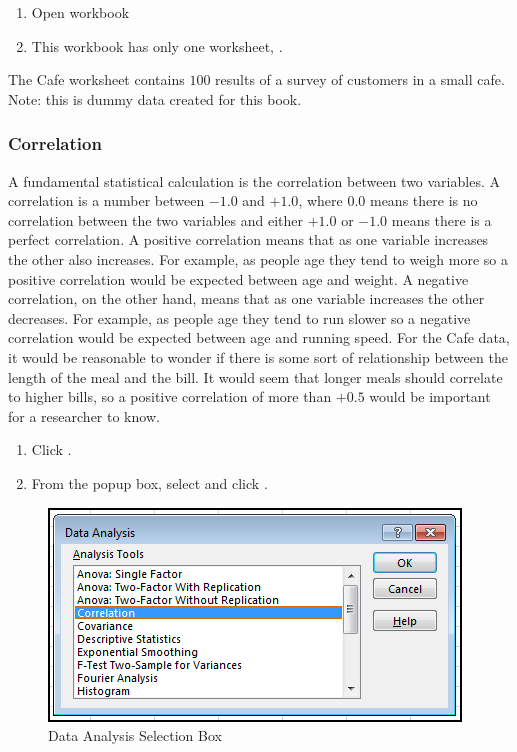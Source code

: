 \begin{enumerate}[resume]	
	\item Open workbook 
	\item This workbook has only one worksheet, .
\end{enumerate}

The Cafe worksheet contains $ 100 $ results of a survey of customers in a small cafe. Note: this is dummy data created for this book.

\subsubsection{Correlation}

A fundamental statistical calculation is the correlation between two variables. A correlation is a number between $ -1.0 $ and $ +1.0 $, where $ 0.0 $ means there is no correlation between the two variables and either $ +1.0 $ or $ -1.0 $ means there is a perfect correlation. A positive correlation means that as one variable increases the other also increases. For example, as people age they tend to weigh more so a positive correlation would be expected between age and weight. A negative correlation, on the other hand, means that as one variable increases the other decreases. For example, as people age they tend to run slower so a negative correlation would be expected between age and running speed. For the Cafe data, it would be reasonable to wonder if there is some sort of relationship between the length of the meal and the bill. It would seem that longer meals should correlate to higher bills, so a positive correlation of more than $ +0.5 $ would be important for a researcher to know.

\begin{enumerate}[resume]
	\item Click .
	\item From the popup box, select  and click .
\end{enumerate}

\begin{figure}[H]
	\centering
	\includegraphics[width=\maxwidth{.95\linewidth}]{gfx/ch09_fig54}
	\caption{Data Analysis Selection Box}
	\label{09:fig54}
\end{figure}

